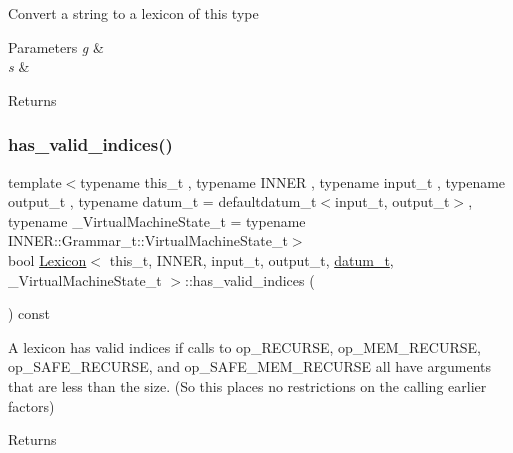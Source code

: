 Convert a string to a lexicon of this type 
\begin{DoxyParams}{Parameters}
{\em g} & \\
\hline
{\em s} & \\
\hline
\end{DoxyParams}
\begin{DoxyReturn}{Returns}

\end{DoxyReturn}
\mbox{\label{class_lexicon_aa9200d0476bd5016e7ea1f049738ed47}} 
\subsubsection{\texorpdfstring{has\+\_\+valid\+\_\+indices()}{has\_valid\_indices()}}
{\footnotesize\ttfamily template$<$typename this\+\_\+t , typename I\+N\+N\+ER , typename input\+\_\+t , typename output\+\_\+t , typename datum\+\_\+t  = defaultdatum\+\_\+t$<$input\+\_\+t, output\+\_\+t$>$, typename \+\_\+\+Virtual\+Machine\+State\+\_\+t  = typename I\+N\+N\+E\+R\+::\+Grammar\+\_\+t\+::\+Virtual\+Machine\+State\+\_\+t$>$ \\
bool \hyperlink{class_lexicon}{Lexicon}$<$ this\+\_\+t, I\+N\+N\+ER, input\+\_\+t, output\+\_\+t, \hyperlink{class_bayesable_a9f1a6c0cd7855550fa10b1a8f13a5867}{datum\+\_\+t}, \+\_\+\+Virtual\+Machine\+State\+\_\+t $>$\+::has\+\_\+valid\+\_\+indices (\begin{DoxyParamCaption}{ }\end{DoxyParamCaption}) const\hspace{0.3cm}{\ttfamily [inline]}}

A lexicon has valid indices if calls to op\+\_\+\+R\+E\+C\+U\+R\+SE, op\+\_\+\+M\+E\+M\+\_\+\+R\+E\+C\+U\+R\+SE, op\+\_\+\+S\+A\+F\+E\+\_\+\+R\+E\+C\+U\+R\+SE, and op\+\_\+\+S\+A\+F\+E\+\_\+\+M\+E\+M\+\_\+\+R\+E\+C\+U\+R\+SE all have arguments that are less than the size. (So this places no restrictions on the calling earlier factors) \begin{DoxyReturn}{Returns}

\end{DoxyReturn}
\mbox{\label{class_lexicon_a53dc77a82e9cb0312ef3de53f0a65b0a}} 
